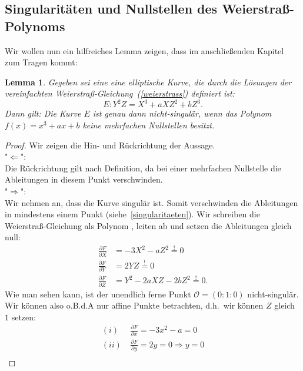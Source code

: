 \documentclass[hidelinks]{article}
\theoremstyle{plain}
\newtheorem{lem}[thm]{Lemma}
\theoremstyle{definition}
\theoremstyle{rem}
\newcommand{\patinf}{\mathcal{O}}
\begin{document}
\begin{sloppypar}
\subsection{Singularitäten und Nullstellen des Weierstraß-Polynoms}
Wir wollen nun ein hilfreiches Lemma zeigen, dass im anschließenden Kapitel zum Tragen kommt:
\begin{lem}
    Gegeben sei eine eine elliptische Kurve, die durch die Lösungen der vereinfachten Weierstraß-Gleichung~(\ref{weierstrass}) definiert ist:
    \begin{equation}
        E: Y^2Z = X^3 + aXZ^2 + bZ^3. 
    \end{equation}
    Dann gilt: Die Kurve $E$ ist genau dann nicht-singulär, wenn das Polynom $f(x) = x^3 + ax + b$ keine mehrfachen Nullstellen besitzt.
\end{lem}
\begin{proof} Wir zeigen die Hin- und Rückrichtung der Aussage.\\
    "$\Leftarrow$": \\
    Die Rückrichtung gilt nach Definition, da bei einer mehrfachen Nullstelle die Ableitungen in diesem Punkt verschwinden.\\
    "$\Rightarrow$": \\
    Wir nehmen an, dass die Kurve singulär ist. Somit verschwinden die Ableitungen in mindestens einem Punkt (siehe~\ref{singularitaeten}).
    Wir schreiben die Weierstraß-Gleichung als Polynom , leiten ab und setzen die Ableitungen gleich null:
    \begin{equation*}
        \begin{split}
		\frac{\partial F}{\partial X} & = -3X^2 - aZ^2 \stackrel{!}{=} 0 \\
            \frac{\partial F}{\partial Y} & = 2YZ \stackrel{!}{=}0 \\
            \frac{\partial F}{\partial Z} & = Y^2 - 2aXZ - 2bZ^2\stackrel{!}{=} 0.
        \end{split}
    \end{equation*}
    Wie man sehen kann, ist der unendlich ferne Punkt $\patinf = (0:1:0)$ nicht-singulär. Wir können also o.B.d.A nur affine Punkte betrachten, d.h.\ wir können $Z$ gleich $1$ setzen:
    \begin{equation*}
        \begin{split}
	    (i) \: & \frac{\partial F}{\partial x}  = -3x^2 - a = 0 \\
	    (ii) \: & \frac{\partial F}{\partial y}  = 2y = 0 \Rightarrow y = 0 \\

\end{split}
\end{equation*}
\end{proof}
\end{sloppypar}
\end{document}

